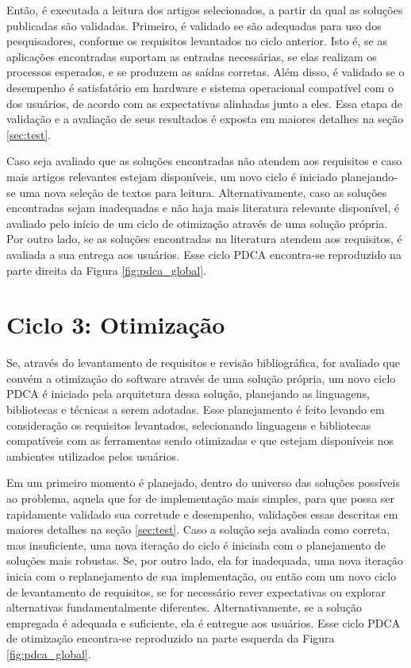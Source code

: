 \documentclass[cic,tc]{iiufrgs}
\begin{document}
Então, é executada a leitura dos artigos selecionados, a partir da qual as
soluções publicadas são validadas. Primeiro, é validado se são adequadas para
uso dos pesquisadores, conforme os requisitos levantados no ciclo anterior.
Isto é, se as aplicações encontradas suportam as entradas necessárias, se elas
realizam os processos esperados, e se produzem as saídas corretas. Além disso,
é validado se o desempenho é satisfatório em hardware e sistema operacional
compatível com o dos usuários, de acordo com as expectativas alinhadas junto a
eles. Essa etapa de validação e a avaliação de seus resultados é exposta em
maiores detalhes na seção \ref{sec:test}. 

Caso seja avaliado que as soluções encontradas não atendem aos requisitos e
caso mais artigos relevantes estejam disponíveis, um novo ciclo é iniciado
planejando-se uma nova seleção de textos para leitura. Alternativamente, caso
as soluções encontradas sejam inadequadas e não haja mais literatura relevante
disponível, é avaliado pelo início de um ciclo de otimização através de uma
solução própria. Por outro lado, se as soluções encontradas na literatura
atendem aos requisitos, é avaliada a sua entrega aos usuários. Esse ciclo PDCA
encontra-se reproduzido na parte direita da Figura \ref{fig:pdca_global}.

\section{Ciclo 3: Otimização}
\label{sec:dev}

Se, através do levantamento de requisitos e revisão bibliográfica, for avaliado
que convém a otimização do software através de uma solução própria, um novo
ciclo PDCA é iniciado pela arquitetura dessa solução, planejando as linguagens,
bibliotecas e técnicas a serem adotadas. Esse planejamento é feito levando em
consideração os requisitos levantados, selecionando linguagens e bibliotecas
compatíveis com as ferramentas sendo otimizadas e que estejam disponíveis nos
ambientes utilizados pelos usuários. 

Em um primeiro momento é planejado, dentro do universo das soluções possíveis
ao problema, aquela que for de implementação mais simples, para que possa ser
rapidamente validado sua corretude e desempenho, validações essas descritas em
maiores detalhes na seção \ref{sec:test}. Caso a solução seja avaliada como correta,
mas insuficiente, uma nova iteração do ciclo é iniciada com o planejamento de
soluções mais robustas. Se, por outro lado, ela for inadequada, uma nova
iteração inicia com o replanejamento de sua implementação, ou então com um novo
ciclo de levantamento de requisitos, se for necessário rever expectativas ou
explorar alternativas fundamentalmente diferentes.  Alternativamente, se a
solução empregada é adequada e suficiente, ela é entregue aos usuários. Esse
ciclo PDCA de otimização encontra-se reproduzido na parte esquerda da Figura
\ref{fig:pdca_global}. 
\end{document}
